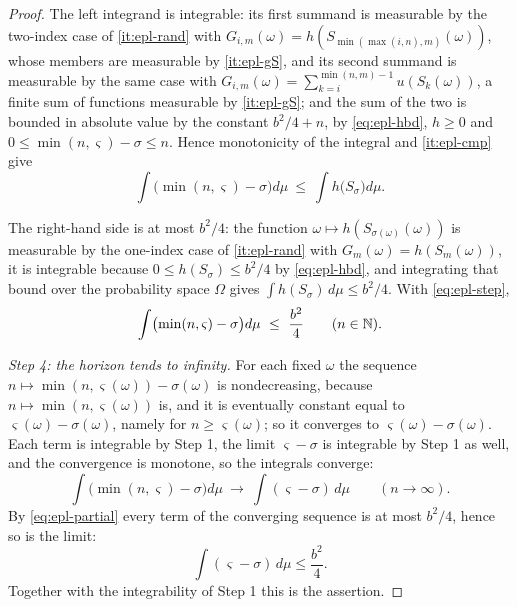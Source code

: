 \begin{proof}
The left integrand is integrable: its first summand is measurable by the
two-index case of \ref{it:epl-rand} with
$G_{i,m}(\omega)=h(S_{\min(\max(i,n),m)}(\omega))$, whose members are
measurable by \ref{it:epl-gS}, and its second summand is measurable by the same
case with $G_{i,m}(\omega)=\sum_{k=i}^{\min(n,m)-1}u(S_k(\omega))$, a finite
sum of functions measurable by \ref{it:epl-gS}; and the sum of the two is
bounded in absolute value by the constant $b^2/4+n$, by \eqref{eq:epl-hbd},
$h\ge0$ and $0\le\min(n,\varsigma)-\sigma\le n$. Hence monotonicity of the
integral and \ref{it:epl-cmp} give
\begin{equation}\label{eq:epl-step}
  \int\bigl(\min(n,\varsigma)-\sigma\bigr)d\mu
   \ \le\ \int h\bigl(S_{\sigma}\bigr)d\mu .
\end{equation}

The right-hand side is at most $b^2/4$: the function
$\omega\mapsto h(S_{\sigma(\omega)}(\omega))$ is measurable by the one-index
case of \ref{it:epl-rand} with $G_m(\omega)=h(S_m(\omega))$, it is integrable
because $0\le h(S_\sigma)\le b^2/4$ by \eqref{eq:epl-hbd}, and integrating that
bound over the probability space $\Omega$ gives
$\int h(S_\sigma)\,d\mu\le b^2/4$. With \eqref{eq:epl-step},
\begin{equation}\label{eq:epl-partial}
  \int\bigl(\min(n,\varsigma)-\sigma\bigr)d\mu\ \le\ \frac{b^2}{4}
  \qquad(n\in\mathbb{N}).
\end{equation}

\emph{Step 4: the horizon tends to infinity.} For each fixed $\omega$ the
sequence $n\mapsto\min(n,\varsigma(\omega))-\sigma(\omega)$ is nondecreasing,
because $n\mapsto\min(n,\varsigma(\omega))$ is, and it is eventually constant
equal to $\varsigma(\omega)-\sigma(\omega)$, namely for
$n\ge\varsigma(\omega)$; so it converges to $\varsigma(\omega)-\sigma(\omega)$.
Each term is integrable by Step 1, the limit $\varsigma-\sigma$ is integrable
by Step 1 as well, and the convergence is monotone, so the integrals converge:
\[
  \int\bigl(\min(n,\varsigma)-\sigma\bigr)d\mu
   \ \longrightarrow\ \int(\varsigma-\sigma)\,d\mu\qquad(n\to\infty).
\]
By \eqref{eq:epl-partial} every term of the converging sequence is at most
$b^2/4$, hence so is the limit:
\[
  \int(\varsigma-\sigma)\,d\mu\le\frac{b^2}{4} .
\]
Together with the integrability of Step 1 this is the assertion.
\end{proof}

